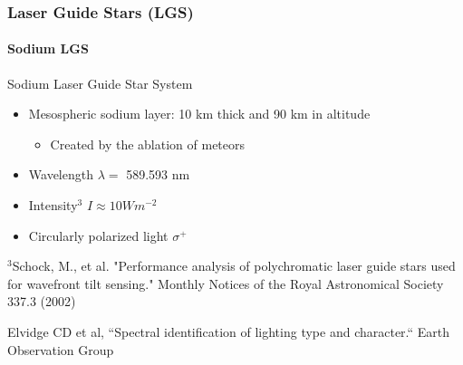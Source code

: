 \documentclass{beamer}
\newcommand{\btVFill}{\vskip0pt plus 1filll}
\begin{document}
\begin{frame}
  \frametitle{Laser Guide Stars (LGS)}
  \framesubtitle{Sodium LGS}
  Sodium Laser Guide Star System
  \begin{itemize}
	\item Mesospheric sodium layer: 10 km thick and 90 km in altitude
	  \begin{itemize}
		\item Created by the ablation of meteors
	  \end{itemize}
  \end{itemize}
  \begin{minipage}{.45\textwidth}
  \begin{itemize}
	\item Wavelength $\lambda=$ 589.593 nm
	\item Intensity$^3$ $I \approx 10 Wm^{-2}$
	\item Circularly polarized light $\sigma ^+$
  \end{itemize}
\end{minipage}
\begin{minipage}{.35\textwidth}
\end{minipage}
	{\tiny $^3$Schock, M., et al. "Performance analysis of polychromatic laser guide stars used for wavefront tilt sensing." Monthly Notices of the Royal Astronomical Society 337.3 (2002)}
 
	  {\tiny Elvidge CD et al, ``Spectral identification of lighting type and character.`` Earth Observation Group}
\end{frame}
\end{document}
